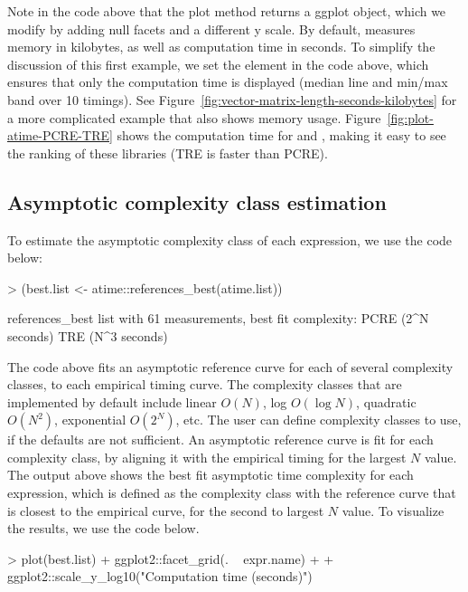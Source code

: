 Note in the code above that the plot method returns a ggplot object, which we modify by adding null facets and a different y scale.
By default,  measures memory in kilobytes, as well as computation time in seconds.
To simplify the discussion of this first example, we set the  element in the code above, which ensures that only the computation time is displayed (median line and min/max band over 10 timings).
See Figure~\ref{fig:vector-matrix-length-seconds-kilobytes} for a more complicated example that also shows memory usage.
Figure~\ref{fig:plot-atime-PCRE-TRE} shows the computation time for  and , making it easy to see the ranking of these libraries (TRE is faster than PCRE).
\subsection{Asymptotic complexity class estimation}

To estimate the asymptotic complexity class of each expression, we use the code below:
\begin{Schunk}
\begin{Sinput}
> (best.list <- atime::references_best(atime.list))
\end{Sinput}
\begin{Soutput}
references_best list with 61 measurements, best fit complexity:
PCRE (2^N seconds)
TRE (N^3 seconds)
\end{Soutput}
\end{Schunk}
The code above fits an asymptotic reference curve for each of several complexity classes, to each empirical timing curve. 
The complexity classes that are implemented by default include linear $O(N)$, log $O(\log N)$, quadratic $O(N^2)$, exponential $O(2^N)$, etc.
The user can define complexity classes to use, if the defaults are not sufficient. 
An asymptotic reference curve is fit for each complexity class, by aligning it with the empirical timing for the largest $N$ value.  
The output above shows the best fit asymptotic time complexity for each expression, which is defined as the complexity class with the reference curve that is closest to the empirical curve, for the second to largest $N$ value. To visualize the results, we use the code below.
\begin{Schunk}
\begin{Sinput}
> plot(best.list) + ggplot2::facet_grid(. ~ expr.name) +
+   ggplot2::scale_y_log10("Computation time (seconds)")
\end{Sinput}
\end{Schunk}

